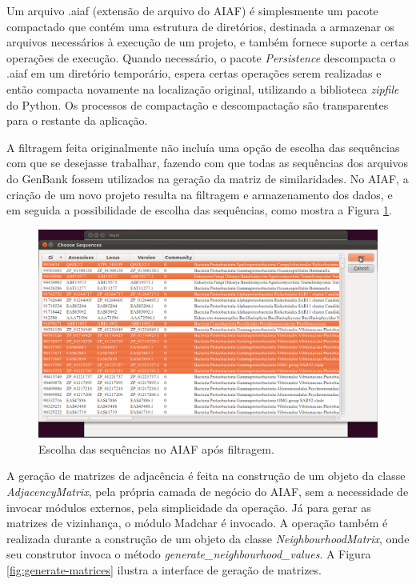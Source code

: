 Um arquivo .aiaf (extensão de arquivo do AIAF) é simplesmente um pacote compactado que contém uma estrutura de diretórios, destinada a armazenar os arquivos
necessários à execução de um projeto, e também fornece suporte a certas operações de execução. Quando necessário, o pacote \textit{Persistence} descompacta
o .aiaf em um diretório temporário, espera certas operações serem realizadas e então compacta novamente na localização original, utilizando a biblioteca
\textit{zipfile} do Python. Os processos de compactação e descompactação são transparentes para o restante da aplicação.

A filtragem feita originalmente não incluía uma opção de escolha das sequências com que se desejasse trabalhar, fazendo com que todas as sequências dos
arquivos do GenBank fossem utilizados na geração da matriz de similaridades. No AIAF, a criação de um novo projeto resulta
na filtragem e armazenamento dos dados, e em seguida a possibilidade de escolha das sequências, como mostra a Figura \ref{fig:choose-sequences}.

\begin{figure}
\centering
\includegraphics[scale=0.38]{choose-sequences}
\caption{Escolha das sequências no AIAF após filtragem.}
\label{fig:choose-sequences}
\end{figure}

A geração de matrizes de adjacência é feita na construção de um objeto da classe \textit{AdjacencyMatrix}, pela própria camada de negócio do AIAF, sem a
necessidade de invocar módulos externos, pela simplicidade da operação. Já para gerar as matrizes de vizinhança, o módulo Madchar é invocado. A operação
também é realizada durante a construção de um objeto da classe \textit{NeighbourhoodMatrix}, onde seu construtor invoca o método
\textit{generate\_neighbourhood\_values}. A Figura \ref{fig:generate-matrices} ilustra a interface de geração de matrizes.

